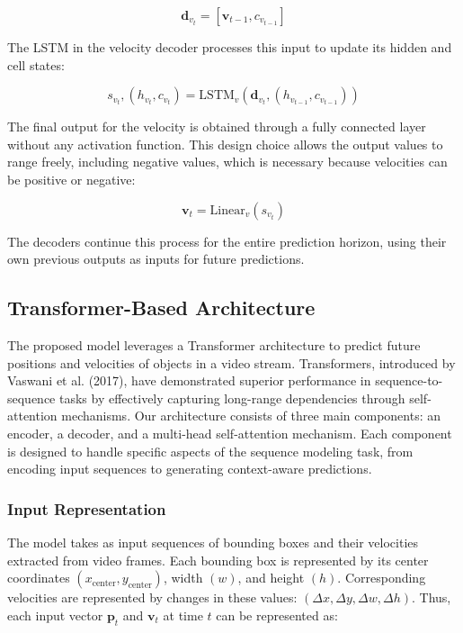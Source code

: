 \documentclass[12pt,oneside]{book} %
\begin{document}
\begin{equation}
    \mathbf{d}_{v_t} = [\mathbf{v}_{t-1}, c_{v_{t-1}}]
\end{equation}

The LSTM in the velocity decoder processes this input to update its hidden and
cell states:

\begin{equation}
    s_{v_t}, (h_{v_t}, c_{v_t}) = \text{LSTM}_v(\mathbf{d}_{v_t}, (h_{v_{t-1}}, c_{v_{t-1}}))
\end{equation}

The final output for the velocity is obtained through a fully connected layer
without any activation function. This design choice allows the output values to
range freely, including negative values, which is necessary because velocities
can be positive or negative:

\begin{equation}
    \mathbf{v}_t = \text{Linear}_v(s_{v_t})
\end{equation}

The decoders continue this process for the entire prediction horizon, using
their own previous outputs as inputs for future predictions.

\subsection{Transformer-Based Architecture}

The proposed model leverages a Transformer architecture to predict future
positions and velocities of objects in a video stream. Transformers, introduced
by Vaswani et al. (2017), have demonstrated superior performance in
sequence-to-sequence tasks by effectively capturing long-range dependencies
through self-attention mechanisms. Our architecture consists of three main
components: an encoder, a decoder, and a multi-head self-attention mechanism.
Each component is designed to handle specific aspects of the sequence modeling
task, from encoding input sequences to generating context-aware predictions.

\subsubsection{Input Representation}

The model takes as input sequences of bounding boxes and their velocities
extracted from video frames. Each bounding box is represented by its center
coordinates $(x_{\text{center}}, y_{\text{center}})$, width $(w)$, and height
$(h)$. Corresponding velocities are represented by changes in these values:
$(\Delta x, \Delta y, \Delta w, \Delta h)$. Thus, each input vector
$\mathbf{p}_t$ and $\mathbf{v}_t$ at time $t$ can be represented as:
\end{document}
